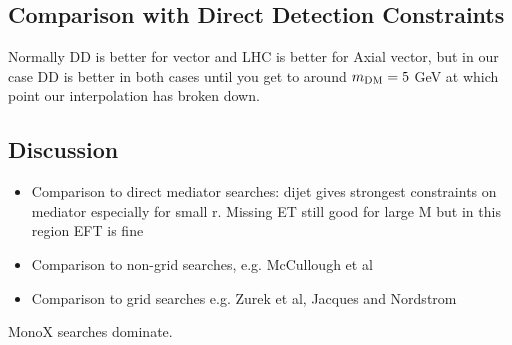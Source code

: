 \subsection{Comparison with Direct Detection Constraints}

Normally DD is better for vector and LHC is better for Axial vector, but in our case DD is better in both cases until you get to around $m_{\mathrm{DM}} = 5$ GeV at which point our interpolation has broken down.


\subsection{Discussion}

\begin{itemize}

\item Comparison to direct mediator searches: dijet gives strongest constraints on mediator especially for small r. Missing ET still good for large M but in this region EFT is fine

\item Comparison to non-grid searches, e.g. McCullough et al

\item Comparison to grid searches e.g. Zurek et al, Jacques and Nordstrom

\end{itemize}

MonoX searches dominate.
